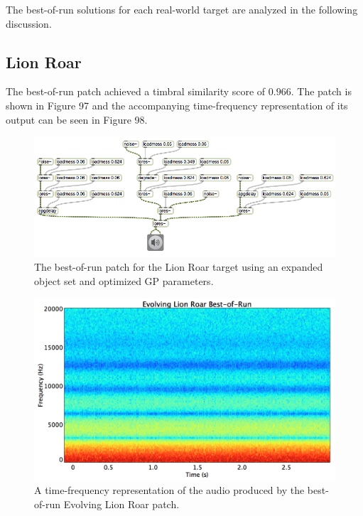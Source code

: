 \documentclass[12pt]{report} 	%
\numberwithin{figure}{chapter}
\numberwithin{table}{chapter}
\numberwithin{equation}{chapter}
\begin{document}
\begin{flushleft}
The best-of-run solutions for each real-world target are analyzed in the following discussion.

\subsection{Lion Roar}
The best-of-run patch achieved a timbral similarity score of $0.966$. The patch is shown in Figure 97 and the accompanying time-frequency representation of its output can be seen in Figure 98.
\begin{figure}[h!]
\begin{center}
\includegraphics[angle = 270, scale = 0.60]{Lion_Best}
\caption[Lion roar best-of-run patch]{The best-of-run patch for the Lion Roar target using an expanded object set and optimized GP parameters.}
\end{center}
\end{figure}
\begin{figure}[h!]
\begin{center}
\includegraphics[scale=0.35,width=\linewidth]{EvolvingLionRoarBestOfRunSTFT}
\caption[Best-of-run evolving lion roar time-frequency representation]{A time-frequency representation of the audio produced by the best-of-run Evolving Lion Roar patch.}
\end{center}

\end{figure}
\end{flushleft}
\end{document}
